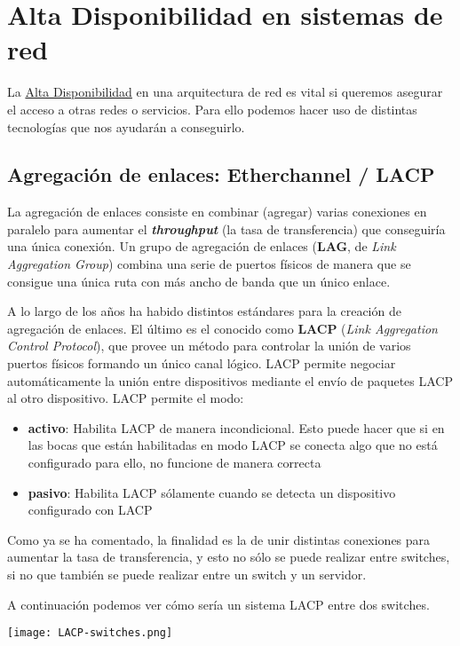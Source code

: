 \chapter{Alta Disponibilidad en sistemas de red}
La \hyperlink{altadisponibilidad}{Alta Disponibilidad} en una arquitectura de red es vital si queremos asegurar el acceso a otras redes o servicios. Para ello podemos hacer uso de distintas tecnologías que nos ayudarán a conseguirlo.



\section{Agregación de enlaces: Etherchannel / LACP}
La agregación de enlaces consiste en combinar (agregar) varias conexiones en paralelo para aumentar el \textit{\textbf{throughput}} (la tasa de transferencia) que conseguiría una única conexión. Un grupo de agregación de enlaces (\textbf{LAG}, de \textit{Link Aggregation Group}) combina una serie de puertos físicos de manera que se consigue una única ruta con más ancho de banda que un único enlace.

A lo largo de los años ha habido distintos estándares para la creación de agregación de enlaces. El último es el conocido como \textbf{LACP} (\textit{Link Aggregation Control Protocol}), que provee un método para controlar la unión de varios puertos físicos formando un único canal lógico. LACP permite negociar automáticamente la unión entre dispositivos mediante el envío de paquetes LACP al otro dispositivo.
LACP permite el modo:

\begin{itemize}
    \item \textbf{activo}: Habilita LACP de manera incondicional. Esto puede hacer que si en las bocas que están habilitadas en modo LACP se conecta algo que no está configurado para ello, no funcione de manera correcta
    \item \textbf{pasivo}: Habilita LACP sólamente cuando se detecta un dispositivo configurado con LACP
\end{itemize}

Como ya se ha comentado, la finalidad es la de unir distintas conexiones para aumentar la tasa de transferencia, y esto no sólo se puede realizar entre switches, si no que también se puede realizar entre un switch y un servidor.

A continuación podemos ver cómo sería un sistema LACP entre dos switches.

\begin{center}
    \vspace{-10pt}
    \texttt{[image: LACP-switches.png]}
    \vspace{-10pt}
\end{center}

